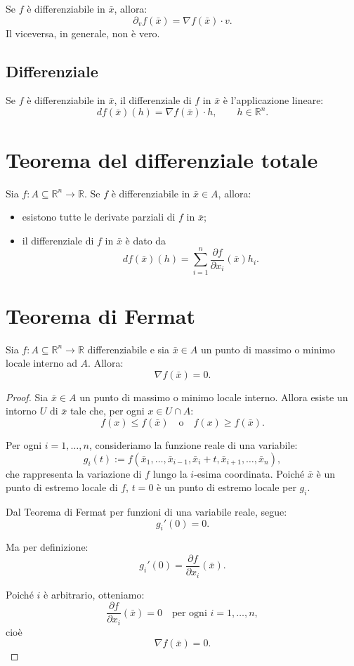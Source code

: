 \documentclass[a4paper,12pt,openright]{book}
\begin{document}
    Se $f$ è differenziabile in $\bar{x}$, allora:
    \[
    \partial_v f(\bar{x}) = \nabla f(\bar{x}) \cdot v.
    \]
    Il viceversa, in generale, non è vero.
    
    \subsection{Differenziale}
    
    Se $f$ è differenziabile in $\bar{x}$, il differenziale di $f$
    in $\bar{x}$ è l'applicazione lineare:
    \[
    df(\bar{x})(h) = \nabla f(\bar{x}) \cdot h,
    \qquad h \in \mathbb{R}^n.
    \]
    
    \section{Teorema del differenziale totale}
    
    Sia $f : A \subseteq \mathbb{R}^n \to \mathbb{R}$.
    Se $f$ è differenziabile in $\bar{x} \in A$, allora:
    \begin{itemize}
    	\item esistono tutte le derivate parziali di $f$ in $\bar{x}$;
    	\item il differenziale di $f$ in $\bar{x}$ è dato da
    	\[
    	df(\bar{x})(h) = \sum_{i=1}^n
    	\frac{\partial f}{\partial x_i}(\bar{x}) h_i.
    	\]
    \end{itemize}
    
    \section{Teorema di Fermat}
    
    Sia $f : A \subseteq \mathbb{R}^n \to \mathbb{R}$ differenziabile
    e sia $\bar{x} \in A$ un punto di massimo o minimo locale interno ad $A$.
    Allora:
    \[
    \nabla f(\bar{x}) = 0.
    \]
    
    \begin{proof}
    	Sia $\bar{x} \in A$ un punto di massimo o minimo locale interno.  
    	Allora esiste un intorno $U$ di $\bar{x}$ tale che, per ogni $x \in U \cap A$:
    	\[
    	f(x) \le f(\bar{x}) \quad \text{o} \quad f(x) \ge f(\bar{x}).
    	\]
    	
    	Per ogni $i = 1, \dots, n$, consideriamo la funzione reale di una variabile:
    	\[
    	g_i(t) := f(\bar{x}_1, \dots, \bar{x}_{i-1}, \bar{x}_i + t, \bar{x}_{i+1}, \dots, \bar{x}_n),
    	\]
    	che rappresenta la variazione di $f$ lungo la $i$-esima coordinata.  
    	Poiché $\bar{x}$ è un punto di estremo locale di $f$, $t=0$ è un punto di estremo locale per $g_i$.
    	
    	Dal Teorema di Fermat per funzioni di una variabile reale, segue:
    	\[
    	g_i'(0) = 0.
    	\]
    	
    	Ma per definizione:
    	\[
    	g_i'(0) = \frac{\partial f}{\partial x_i}(\bar{x}).
    	\]
    	
    	Poiché $i$ è arbitrario, otteniamo:
    	\[
    	\frac{\partial f}{\partial x_i}(\bar{x}) = 0 \quad \text{per ogni } i = 1, \dots, n,
    	\]
    	cioè
    	\[
    	\nabla f(\bar{x}) = 0.
    	\]
    \end{proof}
    
\end{document}
